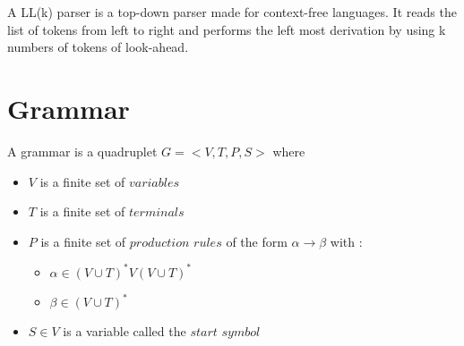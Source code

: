 \documentclass{article}
\begin{document}
\noindent A LL(k) parser is a top-down parser made for context-free languages. It reads the list of tokens from left to right and performs the left most derivation by using k numbers of tokens of look-ahead.

\section{Grammar}

A grammar is a quadruplet $G = <V,T,P,S>$
where
\begin{itemize}
    \item $V$ is a finite set of $variables$
    \item $T$ is a finite set of $terminals$
    \item $P$ is a finite set of $production$ $rules$ of the form $\alpha \to \beta$ with :
    \begin{itemize}
        \item $\alpha \in (V \cup T)^* V(V \cup T)^*$
        \item $\beta \in (V \cup T)^*$
    \end{itemize}
    \item $S \in V$ is a variable called the $start$ $symbol$
\end{itemize}
\end{document}
